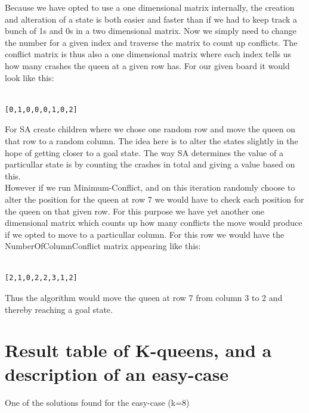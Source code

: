 \documentclass[12pt, a4paper]{article}
\begin{document}
\noindent
Because we have opted to use a one dimensional matrix internally, the creation and alteration of a state is both easier and faster than if we had to keep track a bunch of 1s and 0s in a two dimensional matrix. Now we simply need to change the number for a given index and traverse the matrix to count up conflicts. The conflict matrix is thus also a one dimensional matrix where each index tells us how many crashes the queen at a given row has. For our given board it would look like this:

\begin{verbatim}

[0,1,0,0,0,1,0,2]

\end{verbatim}

\noindent
For SA create children where we chose one random row and move the queen on that row to a random column. The idea here is to alter the states slightly in the hope of getting closer to a goal state. The way SA determines the value of a particullar state is by counting the crashes in total and giving a value based on this. 
\\
However if we run Minimum-Conflict, and on this iteration randomly choose to alter the position for the queen at row 7 we would have to check each position for the queen on that given row. For this purpose we have yet another one dimensional matrix which counts up how many conflicts the move would produce if we opted to move to a particullar column. For this row we would have the NumberOfColumnConflict matrix appearing like this:

\begin{verbatim}

[2,1,0,2,2,3,1,2]

\end{verbatim}
\noindent
Thus the algorithm would move the queen at row 7 from column 3 to 2 and thereby reaching a goal state. 


\section{Result table of K-queens, and a description of an easy-case}
One of the solutions found for the easy-case (k=8)
\end{document}
